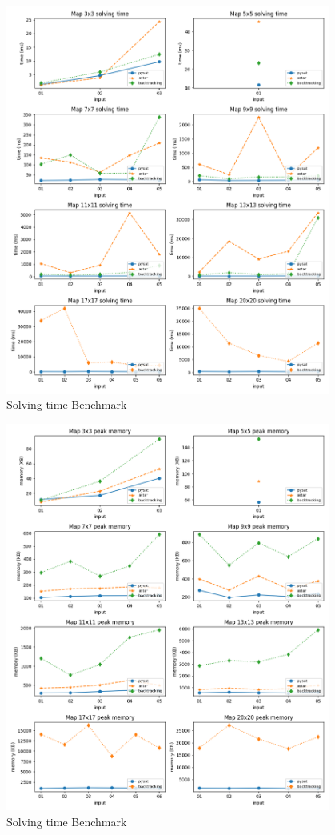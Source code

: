 \pagebreak
\begin{figure}[!ht]
    \centering
    \includegraphics[width=0.95\textwidth]{imgs/benchmark-solving_time.png}
    \caption{Solving time Benchmark}
\end{figure}
\pagebreak
\begin{figure}[!ht]
    \centering
    \includegraphics[width=0.95\textwidth]{imgs/benchmark-peak_memory.png}
    \caption{Solving time Benchmark}
\end{figure}
